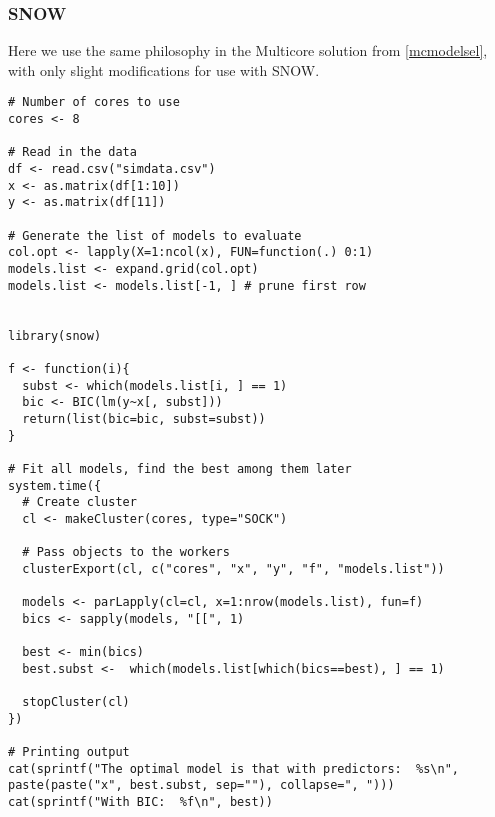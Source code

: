 \subsubsection{SNOW}
Here we use the same philosophy in the Multicore solution from \ref{mcmodelsel}, with only slight modifications for use with SNOW.
\begin{lstlisting}[language=rr]
# Number of cores to use
cores <- 8

# Read in the data
df <- read.csv("simdata.csv")
x <- as.matrix(df[1:10])
y <- as.matrix(df[11])

# Generate the list of models to evaluate
col.opt <- lapply(X=1:ncol(x), FUN=function(.) 0:1)
models.list <- expand.grid(col.opt)
models.list <- models.list[-1, ] # prune first row


library(snow)

f <- function(i){
  subst <- which(models.list[i, ] == 1)
  bic <- BIC(lm(y~x[, subst]))
  return(list(bic=bic, subst=subst))
}

# Fit all models, find the best among them later
system.time({
  # Create cluster
  cl <- makeCluster(cores, type="SOCK")

  # Pass objects to the workers
  clusterExport(cl, c("cores", "x", "y", "f", "models.list"))  
  
  models <- parLapply(cl=cl, x=1:nrow(models.list), fun=f)
  bics <- sapply(models, "[[", 1)

  best <- min(bics)
  best.subst <-  which(models.list[which(bics==best), ] == 1)

  stopCluster(cl)
})

# Printing output
cat(sprintf("The optimal model is that with predictors:  %s\n", paste(paste("x", best.subst, sep=""), collapse=", ")))
cat(sprintf("With BIC:  %f\n", best))
\end{lstlisting}

